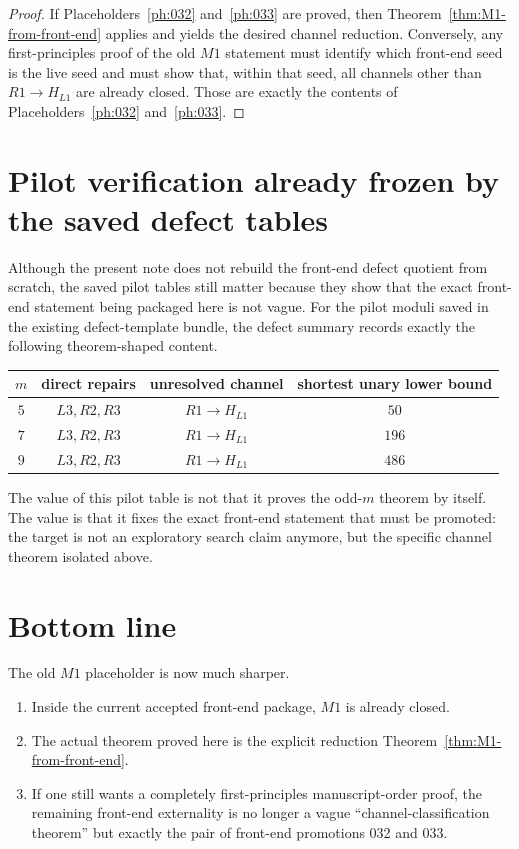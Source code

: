 \documentclass[11pt]{article}
\newcommand{\HLone}{H_{L1}}
\begin{document}
\begin{proof}
If Placeholders~\ref{ph:032} and~\ref{ph:033} are proved, then
Theorem~\ref{thm:M1-from-front-end} applies and yields the desired channel
reduction.
Conversely, any first-principles proof of the old $M1$ statement must identify
which front-end seed is the live seed and must show that, within that seed, all
channels other than $R1\to \HLone$ are already closed. Those are exactly the
contents of Placeholders~\ref{ph:032} and~\ref{ph:033}.
\end{proof}

\section{Pilot verification already frozen by the saved defect tables}

Although the present note does not rebuild the front-end defect quotient from
scratch, the saved pilot tables still matter because they show that the exact
front-end statement being packaged here is not vague.
For the pilot moduli saved in the existing defect-template bundle, the defect
summary records exactly the following theorem-shaped content.

\begin{center}
\begin{tabular}{@{}cccc@{}}
\toprule
$m$ & direct repairs & unresolved channel & shortest unary lower bound \\
\midrule
$5$ & $L3,R2,R3$ & $R1\to \HLone$ & $50$ \\
$7$ & $L3,R2,R3$ & $R1\to \HLone$ & $196$ \\
$9$ & $L3,R2,R3$ & $R1\to \HLone$ & $486$ \\
\bottomrule
\end{tabular}
\end{center}

The value of this pilot table is not that it proves the odd-$m$ theorem by
itself. The value is that it fixes the exact front-end statement that must be
promoted: the target is not an exploratory search claim anymore, but the
specific channel theorem isolated above.

\section{Bottom line}

The old $M1$ placeholder is now much sharper.

\begin{enumerate}[label=\textup{(\arabic*)},leftmargin=2.5em]
\item Inside the current accepted front-end package, $M1$ is already closed.
\item The actual theorem proved here is the explicit reduction
      Theorem~\ref{thm:M1-from-front-end}.
\item If one still wants a completely first-principles manuscript-order proof,
      the remaining front-end externality is no longer a vague
      ``channel-classification theorem'' but exactly the pair of front-end
      promotions \textup{032} and \textup{033}.
\end{enumerate}
\end{document}
